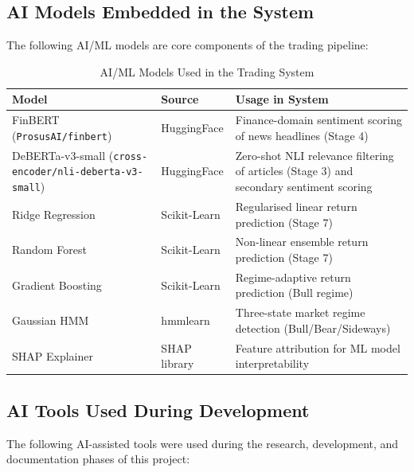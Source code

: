 \documentclass[12pt, a4paper]{article}
\begin{document}
\subsection{AI Models Embedded in the System}

The following AI/ML models are core components of the trading pipeline:

\begin{table}[H]
\centering
\caption{AI/ML Models Used in the Trading System}
\renewcommand{\arraystretch}{1.3}
\begin{tabular}{@{}p{4.5cm} p{2.5cm} p{7cm}@{}}
\toprule
\textbf{Model} & \textbf{Source} & \textbf{Usage in System} \\ \midrule
FinBERT (\texttt{ProsusAI/finbert}) & HuggingFace & Finance-domain sentiment scoring of news headlines (Stage 4) \\
DeBERTa-v3-small (\texttt{cross-encoder/nli-deberta-v3-small}) & HuggingFace & Zero-shot NLI relevance filtering of articles (Stage 3) and secondary sentiment scoring \\
Ridge Regression & Scikit-Learn & Regularised linear return prediction (Stage 7) \\
Random Forest & Scikit-Learn & Non-linear ensemble return prediction (Stage 7) \\
Gradient Boosting & Scikit-Learn & Regime-adaptive return prediction (Bull regime) \\
Gaussian HMM & hmmlearn & Three-state market regime detection (Bull/Bear/Sideways) \\
SHAP Explainer & SHAP library & Feature attribution for ML model interpretability \\
\bottomrule
\end{tabular}
\end{table}

\subsection{AI Tools Used During Development}

The following AI-assisted tools were used during the research, development, and documentation phases of this project:
\end{document}
